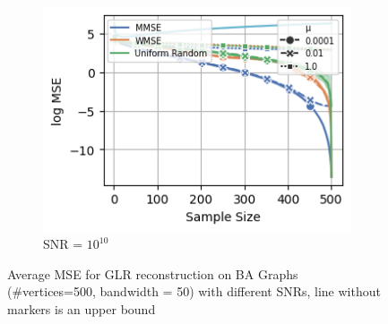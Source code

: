 \begin{figure}
\begin{subfigure}{0.3\columnwidth}
    \label{GLR_BA_MSE_subfigb}%
    \end{subfigure}\hfill%
    \begin{subfigure}{0.3\columnwidth}
    \includegraphics[width=\columnwidth]{figures/proj1/plots/GLR_MSE/BA_3_500_bandwidth_50_SNRdbs_100.0_samps_500_mus_0.0001_0.01_1_full_band.png}
    \caption{SNR = $10^{10}$}%
    \label{GLR_BA_MSE_subfigc}%
    \end{subfigure}%
    \caption{\color{black}Average MSE for GLR reconstruction on BA Graphs (\#vertices=500, bandwidth = 50) with different SNRs, line without markers is an upper bound}
\label{GLR_BA_MSE_fig}
\end{figure}

